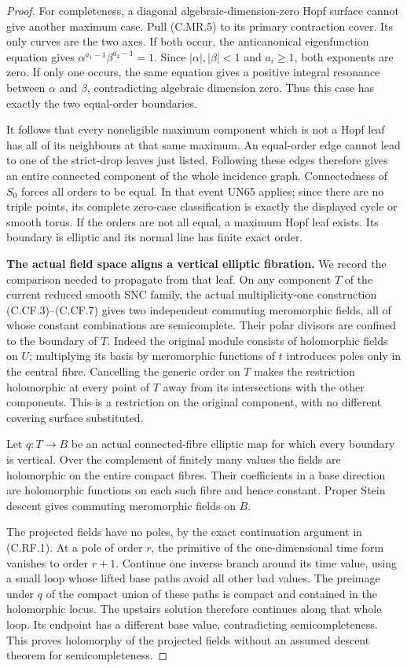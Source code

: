 \begin{proof}
For completeness, a diagonal algebraic-dimension-zero
Hopf surface cannot give another maximum case. Pull
(C.MR.5) to its primary contraction cover. Its only
curves are the two axes. If both occur, the
anticanonical eigenfunction equation gives
$\alpha^{a_1-1}\beta^{a_2-1}=1$.
Since $|\alpha|,|\beta|<1$ and $a_i\ge1$, both
exponents are zero. If only one occurs, the same
equation gives a positive integral resonance
between $\alpha$ and $\beta$, contradicting
algebraic dimension zero. Thus this case has
exactly the two equal-order boundaries.

It follows that every noneligible maximum component
which is not a Hopf leaf has all of its neighbours
at that same maximum. An equal-order edge cannot
lead to one of the strict-drop leaves just listed.
Following these edges therefore gives an entire
connected component of the whole incidence graph.
Connectedness of $S_0$ forces all orders to be equal.
In that event UN65 applies; since there are no triple
points, its complete zero-case classification is
exactly the displayed cycle or smooth torus.
If the orders are not all equal, a maximum Hopf
leaf exists. Its boundary is elliptic and its normal
line has finite exact order.

\par\medskip\noindent\textbf{The actual field space aligns a vertical elliptic fibration.}
We record the comparison needed to propagate from that
leaf. On any component $T$ of the current reduced smooth
SNC family, the actual multiplicity-one construction
(C.CF.3)--(C.CF.7) gives two independent commuting
meromorphic fields, all of whose constant combinations
are semicomplete. Their polar divisors are confined to
the boundary of $T$. Indeed the original module consists
of holomorphic fields on $U$; multiplying its basis by
meromorphic functions of $t$ introduces poles only in
the central fibre. Cancelling the generic order on
$T$ makes the restriction holomorphic at every point
of $T$ away from its intersections with the other
components. This is a restriction on the original
component, with no different covering surface substituted.

Let $q:T\to B$ be an actual connected-fibre elliptic
map for which every boundary is vertical. Over the
complement of finitely many values the fields are
holomorphic on the entire compact fibres. Their
coefficients in a base direction are holomorphic
functions on each such fibre and hence constant.
Proper Stein descent gives commuting meromorphic
fields on $B$.

The projected fields have no poles, by the exact
continuation argument in (C.RF.1). At a pole of
order $r$, the primitive of the one-dimensional
time form vanishes to order $r+1$. Continue one
inverse branch around its time value, using a
small loop whose lifted base paths avoid all
other bad values. The preimage under $q$ of
the compact union of these paths is compact
and contained in the holomorphic locus.
The upstairs solution therefore continues
along that whole loop. Its endpoint has a
different base value, contradicting
semicompleteness. This proves holomorphy of
the projected fields without an assumed
descent theorem for semicompleteness.


\end{proof}
